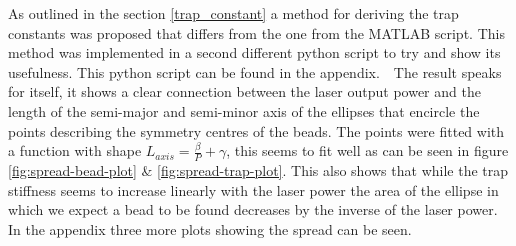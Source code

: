 As outlined in the section \ref{trap_constant} a method for deriving the trap constants was proposed that differs from the one from the MATLAB script. This method was implemented in a second different python script to try and show its usefulness. This python script can be found in the appendix.\
\
 The result speaks for itself, it shows a clear connection between the laser output power and the length of the semi-major and semi-minor axis of the ellipses that encircle the points describing the symmetry centres of the beads. The points were fitted with a function with shape $L_{axis}=\frac{\beta}{P}+\gamma$, this seems to fit well as can be seen in figure \ref{fig:spread-bead-plot} \& \ref{fig:spread-trap-plot}. This also shows that while the trap stiffness seems to increase linearly with the laser power the area of the ellipse in which we expect a bead to be found decreases by  the inverse of the laser power. In the appendix three more plots showing the spread can be seen.

